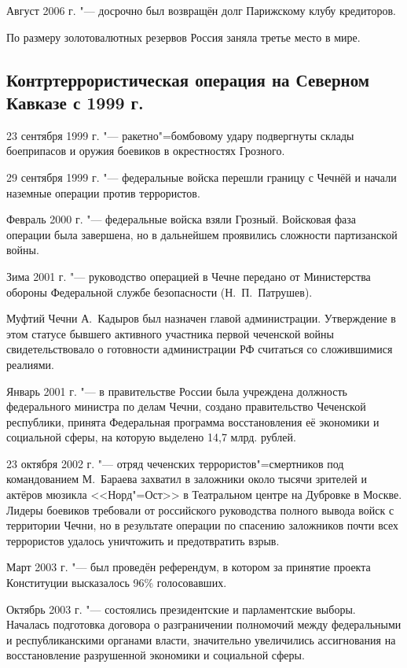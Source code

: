 Август 2006 г. "--- досрочно был возвращён долг Парижскому клубу кредиторов.

По размеру золотовалютных резервов Россия заняла третье место в мире.

\subsection{Контртеррористическая операция на Северном Кавказе с 1999 г.}
23 сентября 1999 г. "--- ракетно"=бомбовому удару подвергнуты склады боеприпасов и оружия боевиков в окрестностях Грозного.

29 сентября 1999 г. "--- федеральные войска перешли границу с Чечнёй и начали наземные операции против террористов.

Февраль 2000 г. "--- федеральные войска взяли Грозный. Войсковая фаза операции была завершена, но в дальнейшем проявились сложности партизанской войны.

Зима 2001 г. "--- руководство операцией в Чечне передано от Министерства обороны Федеральной службе безопасности (Н.~П.~Патрушев).

Муфтий Чечни А.~Кадыров был назначен главой администрации. Утверждение в этом статусе бывшего активного участника первой чеченской войны свидетельствовало о готовности администрации РФ считаться со сложившимися реалиями.

Январь 2001 г. "--- в правительстве России была учреждена должность федерального министра по делам Чечни, создано правительство Чеченской республики, принята Федеральная программа восстановления её экономики и социальной сферы, на которую выделено 14,7 млрд. рублей.

23 октября 2002 г. "--- отряд чеченских террористов"=смертников под командованием М.~Бараева захватил в заложники около тысячи зрителей и актёров мюзикла <<Норд"=Ост>> в Театральном центре на Дубровке в Москве. Лидеры боевиков требовали от российского руководства полного вывода войск с территории Чечни, но в результате операции по спасению заложников почти всех террористов удалось уничтожить и предотвратить взрыв.

Март 2003 г. "--- был проведён референдум, в котором за принятие проекта Конституции высказалось 96\% голосовавших.

Октябрь 2003 г. "--- состоялись президентские и парламентские выборы. Началась подготовка договора о разграничении полномочий между федеральными и республиканскими органами власти, значительно увеличились ассигнования на восстановление разрушенной экономики и социальной сферы.

